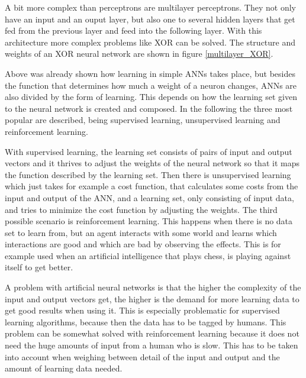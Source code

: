 A bit more complex than perceptrons are multilayer perceptrons. They not only have an input and an ouput layer, but also one to several hidden layers that get fed from the previous layer and feed into the following layer. With this architecture more complex problems like XOR can be solved. The structure and weights of an XOR neural network are shown in figure \ref{multilayer_XOR}. \cite{introToNNs}


Above was already shown how learning in simple ANNs takes place, but besides the function that determines how much a weight of a neuron changes, ANNs are also divided by the form of learning. This depends on how the learning set given to the neural network is created and composed. In the following the three most popular are described, being supervised learning, unsupervised learning and reinforcement learning. \cite{introToNNs}

With supervised learning, the learning set consists of pairs of input and output vectors and it thrives to adjust the weights of the neural network so that it maps the function described by the learning set. Then there is unsupervised learning which just takes for example a cost function, that calculates some costs from the input and output of the ANN, and a learning set, only consisting of input data, and tries to minimize the cost function by adjusting the weights. The third possible scenario is reinforcement learning. This happens when there is no data set to learn from, but an agent interacts with some world and learns which interactions are good and which are bad by observing the effects. This is for example used when an artificial intelligence that plays chess, is playing against itself to get better. \cite{introToNNs}

A problem with artificial neural networks is that the higher the complexity of the input and output vectors get, the higher is the demand for more learning data to get good results when using it. This is especially problematic for supervised learning algorithms, because then the data has to be tagged by humans. This problem can be somewhat solved with reinforcement learning because it does not need the huge amounts of input from a human who is slow. This has to be taken into account when weighing between detail of the input and output and the amount of learning data needed.